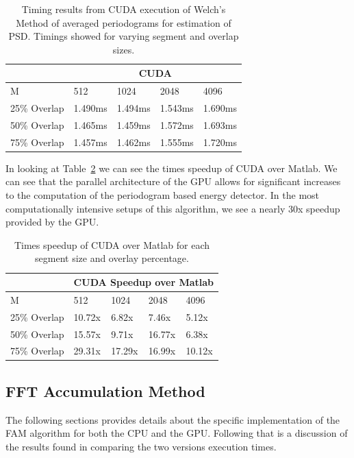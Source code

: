\begin{table}
\begin{center}
\begin{tabular}{|l|l|l|l|l|}
\hline
 & \multicolumn{4}{|c|}{CUDA} \\
\hline
M & 512 & 1024 & 2048 & 4096 \\
\hline
25\% Overlap & 1.490ms & 1.494ms & 1.543ms & 1.690ms \\
50\% Overlap & 1.465ms & 1.459ms & 1.572ms & 1.693ms \\
75\% Overlap & 1.457ms & 1.462ms & 1.555ms & 1.720ms \\
\hline
\end{tabular}
\caption{Timing results from CUDA execution of Welch's Method of averaged periodograms for estimation of PSD.  Timings showed for varying segment and overlap sizes.}
\label{tbl:pwelch_cuda_timings}
\end{center}
\end{table}

In looking at Table~\ref{tbl:pwelch_cuda_speedup} we can see the times speedup of CUDA over Matlab.  We can see that the parallel architecture of the GPU allows for significant increases to the computation of the periodogram based energy detector.  In the most computationally intensive setups of this algorithm, we see a nearly 30x speedup provided by the GPU.

\begin{table}
\begin{center}
\begin{tabular}{|l|l|l|l|l|}
\hline
 & \multicolumn{4}{|c|}{CUDA Speedup over Matlab} \\
\hline
M & 512 & 1024 & 2048 & 4096 \\
\hline
25\% Overlap & 10.72x & 6.82x & 7.46x & 5.12x \\
50\% Overlap & 15.57x & 9.71x & 16.77x & 6.38x \\
75\% Overlap & 29.31x & 17.29x & 16.99x & 10.12x \\
\hline
\end{tabular}
\caption{Times speedup of CUDA over Matlab for each segment size and overlay percentage.}
\label{tbl:pwelch_cuda_speedup}
\end{center}
\end{table}


\subsection{FFT Accumulation Method}
\label{sect:FAM_result}
The following sections provides details about the specific implementation of the FAM algorithm for both the CPU and the GPU.  Following that is a discussion of the results found in comparing the two versions execution times.

